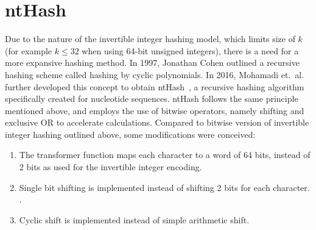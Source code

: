 \documentclass[11pt,a4paper]{scrartcl}
\begin{document}
\section{ntHash}
Due to the nature of the invertible integer hashing model, which limits
size of \(k\) (for example \(k\leq 32\) when using 64-bit
unsigned integers), there is a need for a more expansive hashing method.
In 1997, Jonathan Cohen outlined a recursive hashing scheme called hashing
by cyclic polynomials. In 2016, Mohamadi et.\ al.
further developed this concept to obtain
ntHash~\cite{MOH:CHU:VAN:BIR:2016}, a
recursive hashing algorithm specifically created for nucleotide sequences.
ntHash follows the same principle mentioned above, and
employs the use of bitwise operators, namely shifting and exclusive OR to
accelerate calculations. Compared to bitwise version of invertible integer hashing outlined above, some
modifications were conceived:
\begin{enumerate}
\item The transformer function maps each character to a word of
64 bits, instead of 2 bits as used for the invertible integer encoding.
\item
Single bit shifting is implemented instead of shifting 2 bits for each character. .
\item
Cyclic shift is implemented instead of simple arithmetic shift.
\end{enumerate}
\end{document}
